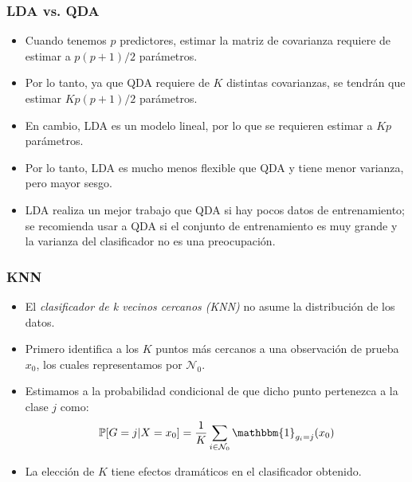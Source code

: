 \documentclass[usenames,dvipsnames]{beamer} %
\newcommand\defi[1]{\textcolor{NavyBlue}{\textit{#1}}}
\begin{document}
\begin{frame}\frametitle{LDA vs. QDA}
\begin{itemize}
	\item Cuando tenemos $p$ predictores, estimar la matriz de covarianza requiere de estimar a $p(p+1)/2$ par\'ametros.
	\item Por lo tanto, ya que QDA requiere de $K$ distintas covarianzas, se tendr\'an que estimar $K p(p+1)/2$ par\'ametros.
	\item En cambio, LDA es un modelo lineal, por lo que se requieren estimar a $K p$ par\'ametros.
	\item Por lo tanto, LDA es mucho menos flexible que QDA y tiene menor varianza, pero mayor sesgo. 
	\item LDA realiza un mejor trabajo que QDA si hay pocos datos de entrenamiento; se recomienda usar a QDA si el conjunto de entrenamiento es muy grande y la varianza del clasificador no es una preocupaci\'on.
\end{itemize}
\end{frame}

\begin{frame}\frametitle{KNN}
\begin{itemize}
	\item El \defi{clasificador de k vecinos cercanos (KNN)} no asume la distribuci\'on de los datos.
	\item Primero identifica a los $K$ puntos m\'as cercanos a una observaci\'on de prueba $x_0$, los cuales representamos por $\mathcal{N}_0$.
	\item Estimamos a la probabilidad condicional de que dicho punto pertenezca a la clase $j$ como:
	\begin{equation}\label{eq:islr_2-12}
	\mathbb{P}[G=j|X=x_0]=\frac{1}{K}\sum_{i \in\mathcal{N}_0}\mathbbm{1}_{g_i=j}(x_0)
	\end{equation}
	\item La elecci\'on de $K$ tiene efectos dram\'aticos en el clasificador obtenido.
\end{itemize}
\end{frame}
\end{document}
